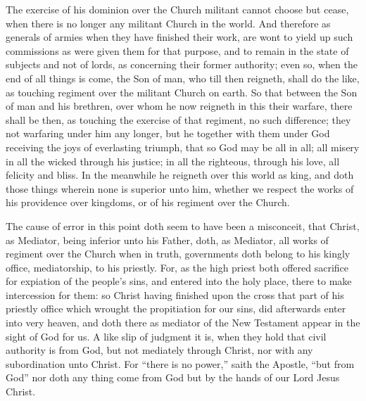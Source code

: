 The exercise of his dominion over the Church militant cannot choose but cease, when there is no longer any militant Church in the world. And therefore as generals of armies when they have finished their work, are wont to yield up such commissions as were given them for that purpose, and to remain in the state of subjects and not of lords, as concerning their former authority; even so, when the end of all things is come, the Son of man, who till then reigneth, shall do the like, as touching regiment over the militant Church on earth. So that between the Son of man and his brethren, over whom he now reigneth in this their warfare, there shall be then, as touching the exercise of that regiment, no such difference; they not warfaring under him any longer, but he together with them under God receiving the joys of everlasting triumph, that so God may be all in all; all misery in all the wicked through his justice; in all the righteous, through his  love, all felicity and bliss. In the meanwhile he reigneth over this world as king, and doth those things wherein none is superior unto him, whether we respect the works of his providence over kingdoms, or of his regiment over the Church.

The cause of error in this point doth seem to have been a misconceit, that Christ, as Mediator, being inferior unto his Father, doth, as Mediator, all works of regiment over the Church when in truth, governments doth belong to his kingly office, mediatorship, to his priestly. For, as the high priest both offered sacrifice for expiation of the people’s sins, and entered into the holy place, there to make intercession for them: so Christ having finished upon the cross that part of his priestly office which wrought the propitiation for our sins, did afterwards enter into very heaven, and doth there as mediator of the New Testament appear in the sight of God for us. A like slip of judgment it is, when they hold that civil authority is from God, but not mediately through Christ, nor with any subordination unto Christ. For “there is no power,” saith the Apostle, “but from God” nor doth any thing come from God but by the hands of our Lord Jesus Christ.


